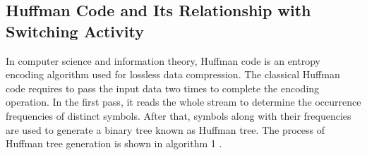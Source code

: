 \documentclass[preprint,12pt]{elsarticle}
\begin{document}
\subsection{Huffman Code and Its Relationship with Switching Activity}
In computer science and information theory, Huffman code is an entropy encoding algorithm used for lossless data compression. The classical Huffman code requires to pass the input data two times to complete the encoding operation. In the first pass, it reads the whole stream to determine the occurrence frequencies of distinct symbols. After that, symbols along with their frequencies are used to generate a binary tree known as Huffman tree. The process of Huffman tree generation is shown in algorithm 1 \cite{Cormen2001}.
 
\end{document}
